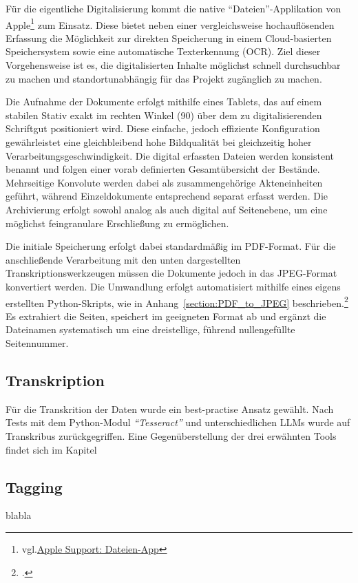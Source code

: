 \documentclass[12pt, a4paper, ngerman, bidi=default]{article}
\let\cite\footcite
\begin{document}
Für die eigentliche Digitalisierung kommt die native \enquote{Dateien}-Applikation von 
Apple\footnote{vgl.\href{https://support.apple.com/de-de/guide/preview/prvw28034/mac}{Apple Support: Dateien-App}} zum Einsatz. 
Diese bietet neben einer vergleichsweise hochauflösenden Erfassung die Möglichkeit zur direkten Speicherung in einem Cloud-basierten 
Speichersystem sowie eine automatische Texterkennung (OCR). Ziel dieser Vorgehensweise ist es, die digitalisierten Inhalte möglichst 
schnell durchsuchbar zu machen und standortunabhängig für das Projekt zugänglich zu machen.

Die Aufnahme der Dokumente erfolgt mithilfe eines Tablets, das auf einem stabilen Stativ exakt im rechten Winkel (90\textdegree)
über dem zu digitalisierenden Schriftgut positioniert wird. Diese einfache, jedoch effiziente Konfiguration gewährleistet eine 
gleichbleibend hohe Bildqualität bei gleichzeitig hoher Verarbeitungsgeschwindigkeit. Die digital erfassten Dateien werden konsistent
 benannt und folgen einer vorab definierten Gesamtübersicht der Bestände. Mehrseitige Konvolute werden dabei als zusammengehörige 
 Akteneinheiten geführt, während Einzeldokumente entsprechend separat erfasst werden. Die Archivierung erfolgt sowohl analog als auch 
 digital auf Seitenebene, um eine möglichst feingranulare Erschließung zu ermöglichen.

Die initiale Speicherung erfolgt dabei standardmäßig im PDF-Format. Für die anschließende Verarbeitung mit den unten dargestellten 
Transkriptionswerkzeugen müssen die Dokumente jedoch in das JPEG-Format konvertiert werden. Die Umwandlung erfolgt automatisiert 
mithilfe eines eigens erstellten Python-Skripts, wie in Anhang~\ref{section:PDF_to_JPEG} beschrieben.\cite{burkhardt_githubpdf_to_jpegpy_2025}
Es extrahiert die Seiten, speichert im geeigneten 
Format ab und ergänzt die Dateinamen systematisch um eine dreistellige, führend nullengefüllte Seitennummer.

\subsection{Transkription}
Für die Transkrition der Daten wurde ein best-practise Ansatz gewählt. Nach Tests mit dem Python-Modul \textit{\enquote{Tesseract}} 
und unterschiedlichen LLMs wurde auf Transkribus zurückgegriffen. Eine Gegenüberstellung der drei erwähnten Tools findet 
sich im Kapitel~

\subsection{Tagging}
blabla
\end{document}
